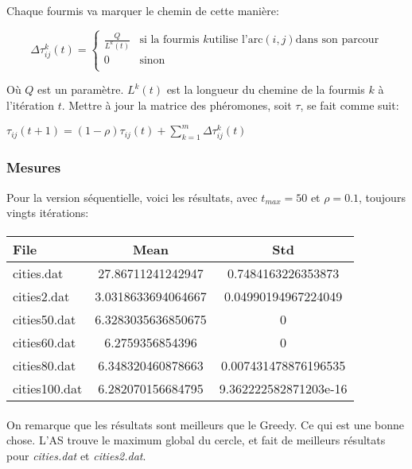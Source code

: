 \documentclass[a4paper, 11pt]{article}
\begin{document}
Chaque fourmis va marquer le chemin de cette manière:
 \begin{center}
  \begin{displaymath}
    \Delta\tau_{ij}^k(t) = 
    \left\lbrace
      \begin{array}{ll}
	\frac{Q}{L^k(t)} & \text{si la fourmis } k \text{utilise l'arc} (i,j) \text{dans son parcour}\\
	0 & \text{sinon } \\
      \end{array}
    \right.
\end{displaymath}
 \end{center}

 Où $Q$ est un paramètre. $L^k(t)$ est la longueur du chemine de la fourmis $k$ à l'itération $t$.
Mettre à jour la matrice des phéromones, soit $\tau$, se fait comme suit:
\begin{center}
 \begin{math}
  \tau_{ij}(t+1) = (1-\rho)\tau_{ij}(t) + \sum\limits_{k=1}^{m} \Delta\tau_{ij}^k(t)
 \end{math}
\end{center}

\subsubsection{Mesures}
Pour la version séquentielle, voici les résultats, avec $t_{max} = 50$ et $\rho = 0.1$, toujours vingts itérations:
\paragraph{}
\begin{tabular}{|l|c|c|}
 \hline
 File & Mean & Std\\
 \hline
cities.dat	& 27.86711241242947  & 0.7484163226353873 \\
 \hline
 cities2.dat	& 3.0318633694064667  & 0.04990194967224049\\
 \hline
cities50.dat	& 6.3283035636850675  & 0\\
 \hline
cities60.dat	& 6.2759356854396  & 0\\
 \hline
cities80.dat	& 6.348320460878663  & 0.007431478876196535\\
 \hline
cities100.dat	& 6.282070156684795  & 9.362222582871203e-16\\
 \hline
\end{tabular}

\paragraph{}
On remarque que les résultats sont meilleurs que le Greedy. Ce qui est une bonne chose. L'AS trouve le maximum global du cercle, et fait 
de meilleurs résultats pour \textit{cities.dat} et \textit{cities2.dat}.
\end{document}
